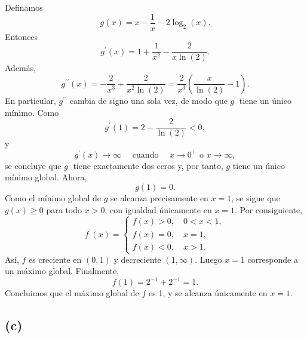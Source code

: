 \documentclass[12pt,a4paper]{article}
\newcommand{\paren}[1]{\left( #1 \right)}
\begin{document}
\begin{solucion}
        Definamos
        \begin{equation*}
            g(x)=x-\frac{1}{x}-2\log_{2}(x).
        \end{equation*}
        Entonces
        \begin{equation*}
            g^{\prime}(x)=1+\frac{1}{x^{2}}-\frac{2}{x\ln(2)}.
        \end{equation*}
        Además,
        \begin{equation*}
            g^{\prime\prime}(x)=-\frac{2}{x^{3}}+\frac{2}{x^{2}\ln(2)}=\frac{2}{x^{3}}\paren{\frac{x}{\ln(2)}-1}.
        \end{equation*}
        En particular, $g^{\prime\prime}$ cambia de signo una sola vez, de modo que $g^{\prime}$
        tiene un único mínimo. Como
        \begin{equation*}
            g^{\prime}(1)=2-\frac{2}{\ln(2)}\lt0,
        \end{equation*}
        y
        \begin{equation*}
            g^{\prime}(x)\to\infty\quad\text{ cuando }\quad x\to0^{+}\text{ o }x\to\infty,
        \end{equation*}
        se concluye que $g^{\prime}$ tiene exactamente dos ceros y, por tanto, $g$ tiene
        un único mínimo global. Ahora,
        \begin{equation*}
            g(1)=0.
        \end{equation*}
        Como el mínimo global de $g$ se alcanza precisamente en $x=1$, se sigue que $g(x)\geq0$
        para todo $x\gt0$, con igualdad únicamente en $x=1$. Por consiguiente,
        \begin{equation*}
            f^{\prime}(x)=
            \begin{cases}
                f(x)\gt0,\quad0\lt x\lt1,\\
                f(x)=0,\quad x=1,\\
                f(x)\lt0,\quad x\gt1.
            \end{cases}
        \end{equation*}
        Así, $f$ es creciente en $(0,1)$ y decreciente $(1,\infty)$. Luego $x=1$ corresponde a un
        máximo global. Finalmente,
        \begin{equation*}
            f(1)=2^{-1}+2^{-1}=1.
        \end{equation*}
        Concluimos que el máximo global de $f$ es 1, y se alcanza únicamente en $x=1$.

        \subsection*{(c)}


\end{solucion}
\end{document}
